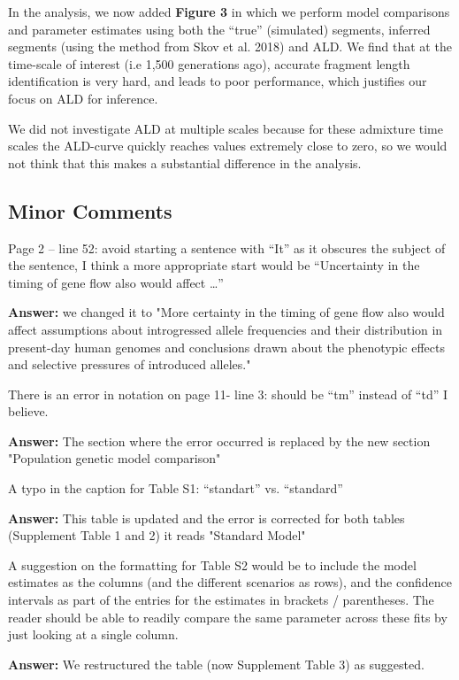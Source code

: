 \documentclass[11pt]{article}
\begin{document}
In the analysis, we now added \textbf{Figure 3} in which we perform model comparisons and parameter estimates using both the ``true'' (simulated) segments, inferred segments (using the method from Skov et al. 2018) and ALD. We find that at the time-scale of interest (i.e 1,500 generations ago), accurate fragment length identification is very hard, and leads to poor performance, which justifies our focus on ALD for inference. 

We did not investigate ALD at multiple scales because for these admixture time scales the ALD-curve quickly reaches values extremely close to zero, so we would not think that this makes a substantial difference in the analysis. 


\subsection{Minor Comments}\label{Minor Comments}
Page 2 – line 52: avoid starting a sentence with “It” as it obscures the subject of the sentence, I think a more appropriate start would be “Uncertainty in the timing of gene flow also would affect …”

\textbf{Answer:} we changed it to "More certainty in the timing of gene flow also would affect  assumptions about introgressed allele frequencies and their distribution in present-day human genomes and conclusions drawn about the phenotypic effects and selective pressures of introduced alleles."

There is an error in notation on page 11- line 3: should be “tm” instead of “td” I believe.

\textbf{Answer:} The section where the error occurred is replaced by the new section "Population genetic model comparison"

A typo in the caption for Table S1: “standart” vs. “standard”

\textbf{Answer:} This table is updated and the error is corrected for both tables (Supplement Table 1 and 2) it reads "Standard Model"

A suggestion on the formatting for Table S2 would be to include the model estimates as the columns (and the different scenarios as rows), and the confidence intervals as part of the entries for the estimates in brackets / parentheses. The reader should be able to readily compare the same parameter across these fits by just looking at a single column. 

\textbf{Answer:} We restructured the table (now Supplement Table 3) as suggested.
\end{document}
